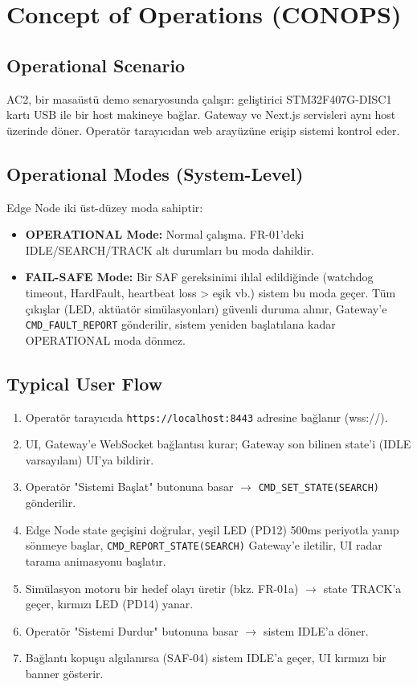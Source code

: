 \section{Concept of Operations (CONOPS)}

\subsection{Operational Scenario}
AC2, bir masaüstü demo senaryosunda çalışır: geliştirici STM32F407G-DISC1 kartı USB ile bir host makineye bağlar. Gateway ve Next.js servisleri aynı host üzerinde döner. Operatör tarayıcıdan web arayüzüne erişip sistemi kontrol eder.

\subsection{Operational Modes (System-Level)}
Edge Node iki üst-düzey moda sahiptir:
\begin{itemize}
    \item \textbf{OPERATIONAL Mode:} Normal çalışma. FR-01'deki IDLE/SEARCH/TRACK alt durumları bu moda dahildir.
    \item \textbf{FAIL-SAFE Mode:} Bir SAF gereksinimi ihlal edildiğinde (watchdog timeout, HardFault, heartbeat loss > eşik vb.) sistem bu moda geçer. Tüm çıkışlar (LED, aktüatör simülasyonları) güvenli duruma alınır, Gateway'e \texttt{CMD\_FAULT\_REPORT} gönderilir, sistem yeniden başlatılana kadar OPERATIONAL moda dönmez.
\end{itemize}

\subsection{Typical User Flow}
\begin{enumerate}[1.]
    \item Operatör tarayıcıda \texttt{https://localhost:8443} adresine bağlanır (wss://).
    \item UI, Gateway'e WebSocket bağlantısı kurar; Gateway son bilinen state'i (IDLE varsayılanı) UI'ya bildirir.
    \item Operatör "Sistemi Başlat" butonuna basar $\rightarrow$ \texttt{CMD\_SET\_STATE(SEARCH)} gönderilir.
    \item Edge Node state geçişini doğrular, yeşil LED (PD12) 500ms periyotla yanıp sönmeye başlar, \texttt{CMD\_REPORT\_STATE(SEARCH)} Gateway'e iletilir, UI radar tarama animasyonu başlatır.
    \item Simülasyon motoru bir hedef olayı üretir (bkz. FR-01a) $\rightarrow$ state TRACK'a geçer, kırmızı LED (PD14) yanar.
    \item Operatör "Sistemi Durdur" butonuna basar $\rightarrow$ sistem IDLE'a döner.
    \item Bağlantı kopuşu algılanırsa (SAF-04) sistem IDLE'a geçer, UI kırmızı bir banner gösterir.
\end{enumerate}

